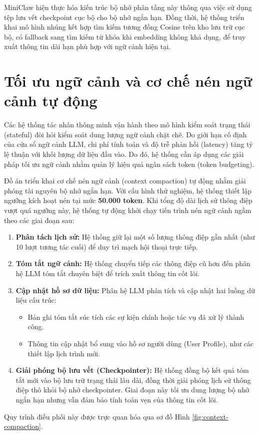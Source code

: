 MiniClaw hiện thực hóa kiến trúc bộ nhớ phân tầng này thông qua việc sử dụng tệp lưu vết checkpoint cục bộ cho bộ nhớ ngắn hạn. Đồng thời, hệ thống triển khai mô hình nhúng kết hợp tìm kiếm tương đồng Cosine trên kho lưu trữ cục bộ, có fallback sang tìm kiếm từ khóa khi embedding không khả dụng, để truy xuất thông tin dài hạn phù hợp với ngữ cảnh hiện tại.

\section{Tối ưu ngữ cảnh và cơ chế nén ngữ cảnh tự động}
Các hệ thống tác nhân thông minh vận hành theo mô hình kiểm soát trạng thái (stateful) đòi hỏi kiểm soát dung lượng ngữ cảnh chặt chẽ. Do giới hạn cố định của cửa sổ ngữ cảnh LLM, chi phí tính toán và độ trễ phản hồi (latency) tăng tỷ lệ thuận với khối lượng dữ liệu đầu vào. Do đó, hệ thống cần áp dụng các giải pháp tối ưu ngữ cảnh nhằm quản lý hiệu quả ngân sách token (token budgeting).

Đồ án triển khai cơ chế nén ngữ cảnh (context compaction) tự động nhằm giải phóng tài nguyên bộ nhớ ngắn hạn. Với cấu hình thử nghiệm, hệ thống thiết lập ngưỡng kích hoạt nén tại mức \textbf{50.000 token}. Khi tổng độ dài lịch sử thông điệp vượt quá ngưỡng này, hệ thống tự động khởi chạy tiến trình nén ngữ cảnh ngầm theo các giai đoạn sau:
\begin{enumerate}
  \item \textbf{Phân tách lịch sử:} Hệ thống giữ lại một số lượng thông điệp gần nhất (như 10 lượt tương tác cuối) để duy trì mạch hội thoại trực tiếp.
  \item \textbf{Tóm tắt ngữ cảnh:} Hệ thống chuyển tiếp các thông điệp cũ hơn đến phân hệ LLM tóm tắt chuyên biệt để trích xuất thông tin cốt lõi.
  \item \textbf{Cập nhật hồ sơ dữ liệu:} Phân hệ LLM phân tích và cập nhật hai luồng dữ liệu cấu trúc:
    \begin{itemize}
      \item Bản ghi tóm tắt súc tích các sự kiện chính hoặc tác vụ đã xử lý thành công.
      \item Thông tin cập nhật bổ sung vào hồ sơ người dùng (User Profile), như các thiết lập lịch trình mới.
    \end{itemize}
  \item \textbf{Giải phóng bộ lưu vết (Checkpointer):} Hệ thống đồng bộ kết quả tóm tắt mới vào bộ lưu trữ trạng thái lâu dài, đồng thời giải phóng lịch sử thông điệp thô khỏi bộ nhớ checkpointer. Giai đoạn này tối ưu dung lượng bộ nhớ ngắn hạn nhưng vẫn đảm bảo tính toàn vẹn của thông tin cốt lõi.
\end{enumerate}
Quy trình điều phối này được trực quan hóa qua sơ đồ Hình \ref{fig:context-compaction}.

